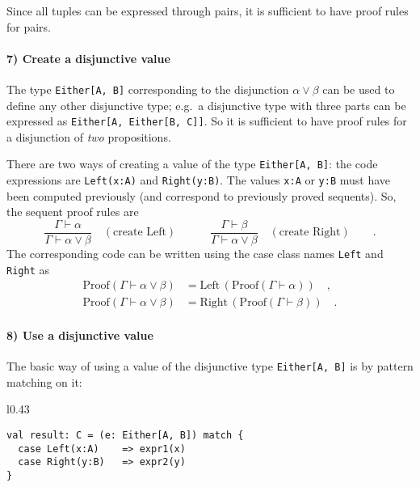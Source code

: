 Since all tuples can be expressed through pairs, it is sufficient
to have proof rules for pairs.

\paragraph{7) Create a disjunctive value}

The type \lstinline!Either[A, B]! corresponding to the disjunction
$\alpha\vee\beta$ can be used to define any other disjunctive type;
e.g.~a disjunctive type with three parts can be expressed as \lstinline!Either[A, Either[B, C]]!.
So it is sufficient to have proof rules for a disjunction of \emph{two}
propositions.

There are two ways of creating a value of the type \lstinline!Either[A, B]!:
the code expressions are \lstinline!Left(x:A)! and \lstinline!Right(y:B)!.
The values \lstinline!x:A! or \lstinline!y:B! must have been computed
previously (and correspond to previously proved sequents). So, the
sequent proof rules are
\[
\frac{\Gamma\vdash\alpha}{\Gamma\vdash\alpha\vee\beta}\quad(\text{create Left})\quad\quad\quad\frac{\Gamma\vdash\beta}{\Gamma\vdash\alpha\vee\beta}\quad(\text{create Right})\quad\quad.
\]
The corresponding code can be written using the case class names \lstinline!Left!
and \lstinline!Right! as 
\begin{align*}
\text{Proof}\left(\Gamma\vdash\alpha\vee\beta\right) & =\text{Left}\,(\text{Proof}\left(\Gamma\vdash\alpha\right))\quad,\\
\text{Proof}\left(\Gamma\vdash\alpha\vee\beta\right) & =\text{Right}\,(\text{Proof}\left(\Gamma\vdash\beta\right))\quad.
\end{align*}


\paragraph{8) Use a disjunctive value}

The basic way of using a value of the disjunctive type \lstinline!Either[A, B]!
is by pattern matching on it:

\begin{wrapfigure}{l}{0.43\columnwidth}%
\vspace{-0.6\baselineskip}
\begin{lstlisting}
val result: C = (e: Either[A, B]) match {
  case Left(x:A)    => expr1(x)
  case Right(y:B)   => expr2(y)
}
\end{lstlisting}

\vspace{-0.9\baselineskip}
\end{wrapfigure}%

